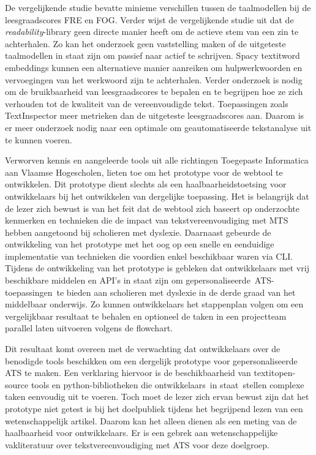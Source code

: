 De vergelijkende studie bevatte minieme verschillen tussen de taalmodellen bij de leesgraadscores FRE en FOG. Verder wijst de vergelijkende studie uit dat de \textit{readability}-library geen directe manier heeft om de actieve stem van een zin te achterhalen. Zo kan het onderzoek geen vaststelling maken of de uitgeteste taalmodellen in staat zijn om passief naar actief te schrijven. Spacy textit{word embeddings} kunnen een alternatieve manier aanreiken om hulpwerkwoorden en vervoegingen van het werkwoord zijn te achterhalen. Verder onderzoek is nodig om de bruikbaarheid van leesgraadscores te bepalen en te begrijpen hoe ze zich verhouden tot de kwaliteit van de vereenvoudigde tekst. Toepassingen zoals TextInspector meer metrieken dan de uitgeteste leesgraadscores aan. Daarom is er meer onderzoek nodig naar een optimale om geautomatiseerde tekstanalyse uit te kunnen voeren.

\medspace

Verworven kennis en aangeleerde tools uit alle richtingen Toegepaste Informatica aan Vlaamse Hogescholen, lieten toe om het prototype voor de webtool te ontwikkelen. Dit prototype dient slechts als een haalbaarheidstoetsing voor ontwikkelaars bij het ontwikkelen van dergelijke toepassing. Het is belangrijk dat de lezer zich bewust is van het feit dat de webtool zich baseert op onderzochte kenmerken en technieken die de impact van tekstvereenvoudiging met MTS hebben aangetoond bij scholieren met dyslexie. Daarnaast gebeurde de ontwikkeling van het prototype met het oog op een snelle en eenduidige implementatie van technieken die voordien enkel beschikbaar waren via CLI. Tijdens de ontwikkeling van het prototype is gebleken dat ontwikkelaars met vrij beschikbare middelen en API's in staat zijn om gepersonaliseerde ATS-toepassingen te bieden aan scholieren met dyslexie in de derde graad van het middelbaar onderwijs. Zo kunnen ontwikkelaars het stappenplan volgen om een vergelijkbaar resultaat te behalen en optioneel de taken in een projectteam parallel laten uitvoeren volgens de flowchart.

\medspace

Dit resultaat komt overeen met de verwachting dat ontwikkelaars over de benodigde tools beschikken om een dergelijk prototype voor gepersonaliseerde ATS te maken. Een verklaring hiervoor is de beschikbaarheid van textit{open-source} tools en python-bibliotheken die ontwikkelaars in staat stellen complexe taken eenvoudig uit te voeren. Toch moet de lezer zich ervan bewust zijn dat het prototype niet getest is bij het doelpubliek tijdens het begrijpend lezen van een wetenschappelijk artikel. Daarom kan het alleen dienen als een meting van de haalbaarheid voor ontwikkelaars. Er is een gebrek aan wetenschappelijke vakliteratuur over tekstvereenvoudiging met ATS voor deze doelgroep.

